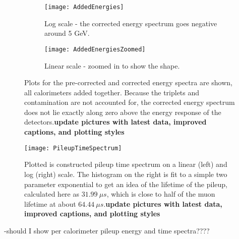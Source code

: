     \begin{figure}[]
    \centering
        \begin{subfigure}[]{0.8\textwidth}
            \centering
            \texttt{[image: AddedEnergies]}
            \caption{Log scale - the corrected energy spectrum goes negative around 5 GeV.}
        \end{subfigure}%
        \vspace{1cm}
        \begin{subfigure}[]{0.8\textwidth}
            \centering
            \texttt{[image: AddedEnergiesZoomed]}
            \caption{Linear scale - zoomed in to show the shape.}
        \end{subfigure}
    \caption[Non-corrected and pileup corrected cluster energies]{Plots for the pre-corrected and corrected energy spectra are shown, all calorimeters added together. Because the triplets and contamination are not accounted for, the corrected energy spectrum does not lie exactly along zero above the energy response of the detectors.\textbf{update pictures with latest data, improved captions, and plotting styles}}
    \label{fig:AddedEnergies}
    \end{figure}


    \begin{figure}[]
        \centering
        \texttt{[image: PileupTimeSpectrum]}
        \caption[Pileup time spectrum above threshold]{Plotted is constructed pileup time spectrum on a linear (left) and log (right) scale. The histogram on the right is fit to a simple two parameter exponential to get an idea of the lifetime of the pileup, calculated here as $\SI{31.99}{\mu s}$, which is close to half of the muon lifetime at about $\SI{64.44}{\mu s}$.\textbf{update pictures with latest data, improved captions, and plotting styles}}
        \label{fig:PileupTimeSpectrum}
    \end{figure}





-should I show per calorimeter pileup energy and time spectra????




